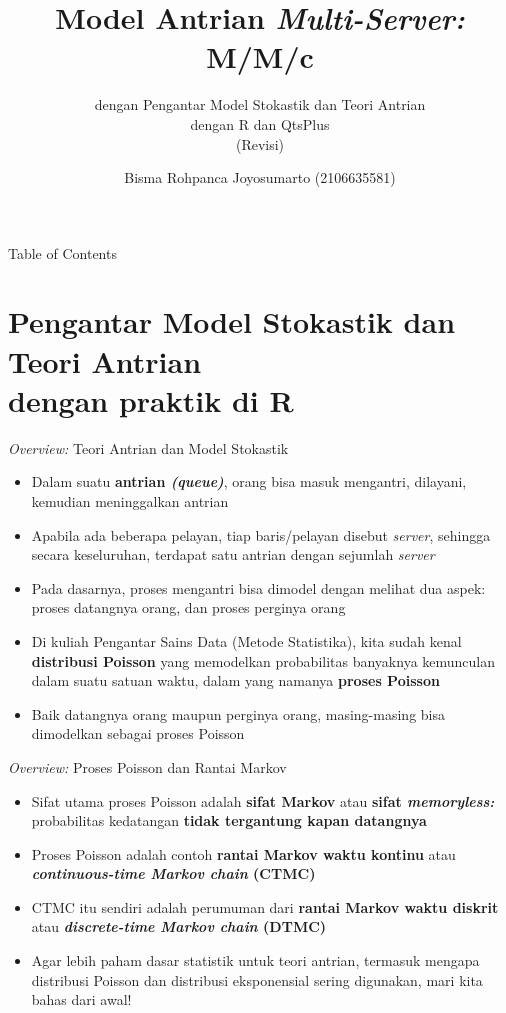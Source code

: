 \documentclass{beamer}
\title{Model Antrian \textit{Multi-Server:} M/M/c}
\subtitle{dengan Pengantar Model Stokastik dan Teori Antrian \\ dengan R dan QtsPlus \\ (Revisi)}
\author{Bisma Rohpanca Joyosumarto (2106635581)}
\institute{Departemen Matematika FMIPA UI \\ Universitas Indonesia}
\date{
    Rabu, 13 November 2024

    Riset Operasi
    
    Tahun Ajaran 2024/2025 Semester Ganjil
}
\begin{document}
\frame{\titlepage}

\begin{frame}{Table of Contents}
    \tableofcontents
\end{frame}

\section[Pengantar Model Stokastik dan Teori Antrian. dengan praktik di R]{Pengantar Model Stokastik dan Teori Antrian \\ dengan praktik di R}

\begin{frame}{\textit{Overview:} Teori Antrian dan Model Stokastik}
    \begin{itemize}
        \item Dalam suatu \textbf{antrian \textit{(queue)}}, orang bisa masuk mengantri, dilayani, kemudian meninggalkan antrian
        \item Apabila ada beberapa pelayan, tiap baris/pelayan disebut \textit{server}, sehingga secara keseluruhan, terdapat satu antrian dengan sejumlah \textit{server}
        \item Pada dasarnya, proses mengantri bisa dimodel dengan melihat dua aspek: proses datangnya orang, dan proses perginya orang
        \item Di kuliah Pengantar Sains Data (Metode Statistika), kita sudah kenal \textbf{distribusi Poisson} yang memodelkan probabilitas banyaknya kemunculan dalam suatu satuan waktu, dalam yang namanya \textbf{proses Poisson}
        \item Baik datangnya orang maupun perginya orang, masing-masing bisa dimodelkan sebagai proses Poisson
    \end{itemize}
\end{frame}

\begin{frame}{\textit{Overview:} Proses Poisson dan Rantai Markov}
    \begin{itemize}
        \item Sifat utama proses Poisson adalah \textbf{sifat Markov} atau \textbf{sifat \textit{memoryless:}} probabilitas kedatangan \textbf{tidak tergantung kapan datangnya}
        \item Proses Poisson adalah contoh \textbf{rantai Markov waktu kontinu} atau \textbf{\textit{continuous-time Markov chain} (CTMC)}
        \item CTMC itu sendiri adalah perumuman dari \textbf{rantai Markov waktu diskrit} atau \textbf{\textit{discrete-time Markov chain} (DTMC)}
        \item Agar lebih paham dasar statistik untuk teori antrian, termasuk mengapa distribusi Poisson dan distribusi eksponensial sering digunakan, mari kita bahas dari awal!
    \end{itemize}
\end{frame}
\end{document}
